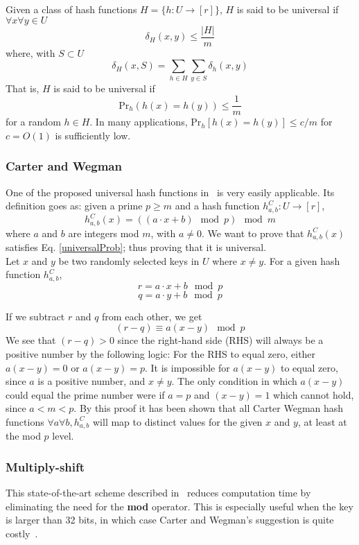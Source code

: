\documentclass[../../main.tex]{subfiles}
\begin{document}
Given a class of hash functions $H = \{h:U\rightarrow [r]\}$, $H$ is said to be universal if $\forall x \forall y \in U$
$$
	\delta_H (x,y) \leq \frac{|H|}{m}
$$
where, with $S\subset U$
$$
\delta_H (x,S) = \sum_{h\in H}\sum_{y\in S} \delta_h(x,y)
$$
That is, $H$ is said to be universal if 
\begin{equation}\label{universalProb}
\mathrm{Pr}_h\left(h(x)=h(y)\right)\leq \frac{1}{m}
\end{equation}
for a random $h \in H$.
In many applications, Pr$_h[h(x)=h(y)]\leq c/m$ for $c=O(1)$ is sufficiently low.

\subsubsection{Carter and Wegman}\label{sec:carter}
One of the proposed universal hash functions in~\cite{carterWegman} is very easily applicable. Its definition goes as: given a prime $p\geq m$ and a hash function $h_{a,b}^C:U\rightarrow [r]$,
\begin{equation}\label{carterhash}
h_{a,b}^{C}(x)=((a \cdot x + b) \mod p) \mod m
\end{equation}
where $a$ and $b$ are integers mod $m$, with $a\neq 0$. We want to prove that $h_{a,b}^{C}(x)$ satisfies Eq. \ref{universalProb}; thus proving that it is universal.\\

\noindent Let $x$ and $y$ be two randomly selected keys in $U$ where $x\neq y$. For a given hash function $h_{a,b}^{C}$,
$$
r = a\cdot x + b \mod p
$$
$$
q = a \cdot y + b \mod p
$$

\noindent If we subtract $r$ and $q$ from each other, we get 
$$
(r - q) \equiv a(x-y) \mod p
$$
We see that $(r-q)>0$ since the right-hand side (RHS) will always be a positive number by the following logic: For the RHS to equal zero, either $a(x-y)=0$ or $a(x-y)=p$. It is impossible for $a(x-y)$ to equal zero, since $a$ is a positive number, and $x\neq y$. The only condition in which $a(x-y)$ could equal the prime number were if $a=p$ and $(x-y)= 1$ which cannot hold, since $a<m<p$. By this proof it has been shown that all Carter Wegman hash functions $\forall a\forall b, h_{a,b}^C$ will map to distinct values for the given $x$ and $y$, at least at the mod $p$ level.

\subsubsection{Multiply-shift}\label{sec:multshift}
This state-of-the-art scheme described in~\cite{Dietzfelbinger} reduces computation time by eliminating the need for the \textbf{mod} operator. This is especially useful when the key is larger than 32 bits, in which case Carter and Wegman's suggestion is quite costly~\cite{dikuHash}.\\
\end{document}
